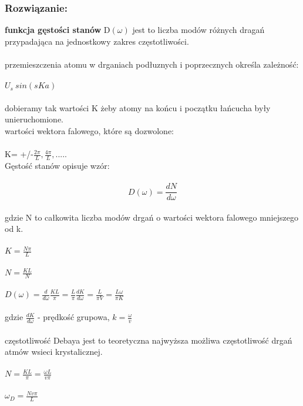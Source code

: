 \subsubsection*{Rozwiązanie:}
\textbf{funkcja gęstości stanów}
D$(\omega)$ jest to liczba modów różnych dragań przypadająca na jednostkowy zakres częstotliwości.
\\
\\
przemieszczenia atomu w drganiach podłuznych i poprzecznych określa zależność:
\\
\\
$U_s ~sin(sKa)$
\\
\\
dobieramy tak wartości K żeby atomy na końcu i początku łańcucha były unieruchomione.
\\
wartości wektora falowego, które są dozwolone:
\\
\\
K= +/-$\frac{2\pi}{L},\frac{4\pi}{L},.....$
\\
Gęstość stanów opisuje wzór:
\\
\\
\begin{equation}
D(\omega)=\frac{dN}{d\omega}
\end{equation}
\\
gdzie N to całkowita liczba modów drgań o wartości wektora falowego mniejszego od k.
\\
\\
$K=\frac{N\pi}{L}$
\\
\\
$N=\frac{KL}{N}$
\\
\\
$D(\omega)=\frac{d}{d\omega}\frac{KL}{\pi}=\frac{L}{\pi}\frac{dK}{d\omega}=\frac{L}{\pi V}=\frac{L\omega}{\pi K}$
\\
\\
gdzie $\frac{dK}{d\omega}$ - prędkość grupowa, $k=\frac{\omega}{v}$
\\
\\
częstotliwość Debaya jest to teoretyczna najwyższa możliwa częstotliwość drgań atmów  wsieci krystalicznej.
\\
\\
$N=\frac{KL}{\pi}=\frac{\omega L}{v\pi}$
\\
\\
$\omega_D=\frac{Nv\pi}{L}$


